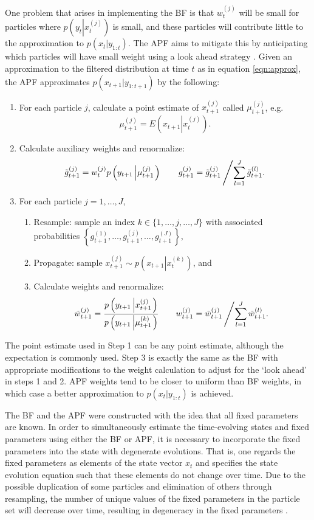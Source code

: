 One problem that arises in implementing the BF is that $w_t^{(j)}$ will be small for particles where $p\left(y_{t}\left|x_{t}^{(j)}\right.\right)$ is small, and these particles will contribute little to the approximation to $p(x_{t}|y_{1:t})$. The APF aims to mitigate this by anticipating which particles will have small weight using a look ahead strategy \citep{Pitt:Shep:filt:1999}. Given an approximation to the filtered distribution at time $t$ as in equation \eqref{eqn:approx}, the APF approximates $p(x_{t+1}|y_{1:t+1})$ by the following:
\begin{enumerate}
\item For each particle $j$, calculate a point estimate of $x_{t+1}^{(j)}$ called $\mu_{t+1}^{(j)}$, e.g.
\[ \mu_{t+1}^{(j)} = E\left(x_{t+1}\left|x_t^{(j)} \right.\right). \]
\item Calculate auxiliary weights and renormalize:
\[ \tilde{g}_{t+1}^{(j)} = w_t^{(j)} p\left(y_{t+1}\left|\mu_{t+1}^{(j)}\right.\right) \qquad g_{t+1}^{(j)} = \tilde{g}_{t+1}^{(j)}\left/\sum_{l=1}^J \tilde{g}_{t+1}^{(l)}.\right. \]
\item For each particle $j=1,\ldots,J$,
	\begin{enumerate}
    \item Resample: sample an index $k\in\{1,\ldots,j,\ldots,J\}$ with associated probabilities $\left\{g_{t+1}^{(1)},\ldots,g_{t+1}^{(j)},\ldots,g_{t+1}^{(J)}\right\}$,
	\item Propagate: sample $x_{t+1}^{(j)} \sim p\left(x_{t+1}\left|x_t^{(k)}\right.\right)$, and
	\item Calculate weights and renormalize:
\[ \tilde{w}_{t+1}^{(j)} = \frac{p\left(y_{t+1}\left|x_{t+1}^{(j)}\right.\right)}{p\left(y_{t+1}\left|\mu_{t+1}^{(k)}\right.\right)} \qquad w_{t+1}^{(j)} = \tilde{w}_{t+1}^{(j)}\left/\sum_{l=1}^J \tilde{w}_{t+1}^{(l)}. \right. \]
	\end{enumerate}
\end{enumerate}
The point estimate used in Step 1 can be any point estimate, although the expectation is commonly used. Step 3 is exactly the same as the BF with appropriate modifications to the weight calculation to adjust for the `look ahead' in steps 1 and 2. APF weights tend to be closer to uniform than BF weights, in which case a better approximation to $p(x_{t}|y_{1:t})$ is achieved.

The BF and the APF were constructed with the idea that all fixed parameters are known. In order to simultaneously estimate the time-evolving states and fixed parameters using either the BF or APF, it is necessary to incorporate the fixed parameters into the state with degenerate evolutions. That is, one regards the fixed parameters as elements of the state vector $x_t$ and specifies the state evolution equation such that these elements do not change over time. Due to the possible duplication of some particles and elimination of others through resampling, the number of unique values of the fixed parameters in the particle set will decrease over time, resulting in degeneracy in the fixed parameters \citep{Liu:West:comb:2001}.

